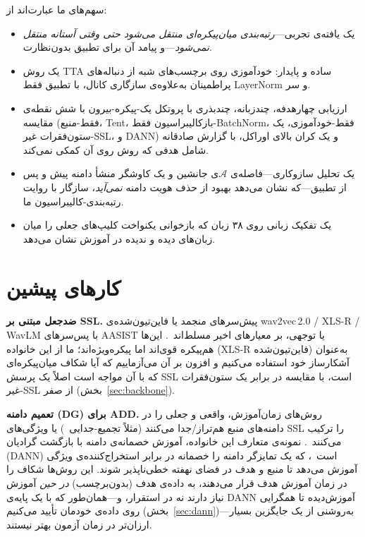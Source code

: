 \documentclass[a4paper,11pt]{article}
\begin{document}
سهم‌های ما عبارت‌اند از:
\begin{itemize}
\item یک یافته‌ی تجربی---\emph{رتبه‌بندی میان‌پیکره‌ای منتقل می‌شود حتی وقتی
آستانه منتقل نمی‌شود}---و پیامد آن برای تطبیق بدون‌نظارت.
\item یک روش TTA ساده و پایدار: خودآموزی روی برچسب‌های شبه از دنباله‌های
پراطمینان به‌علاوه‌ی سازگاری کانال، با تطبیق فقط LayerNorm و سر.
\item ارزیابی چهارهدفه، چندزبانه، چندبذری با پروتکل یک-پیکره-بیرون با شش
نقطه‌ی مقایسه (فقط-منبع، Tent، بازکالیبراسیون فقط-BatchNorm، فقط-خودآموزی،
یک ستون‌فقرات غیر-SSL، و DANN) و یک کران بالای اوراکل، با گزارش صادقانه
شامل هدفی که روش روی آن کمکی نمی‌کند.
\item یک تحلیل سازوکاری---فاصله‌ی $\mathcal{A}$ی جانشین و یک کاوشگر منشأ
دامنه پیش و پس از تطبیق---که نشان می‌دهد بهبود از حذف هویت دامنه
\emph{نمی‌آید}، سازگار با روایت رتبه‌بندی-کالیبراسیون ما.
\item یک تفکیک زبانی روی ۳۸ زبان که بازخوانی یکنواخت کلیپ‌های جعلی را میان
زبان‌های دیده و ندیده در آموزش نشان می‌دهد.
\end{itemize}

\section{کارهای پیشین}
\textbf{ضدجعل مبتنی بر SSL.} پیش‌سرهای منجمد یا فاین‌تیون‌شده‌ی
wav2vec\,2.0 / XLS-R / WavLM با پس‌سرهای AASIST یا توجهی، بر معیارهای اخیر
مسلط‌اند~\cite{wav2vec2aug,xlsrsls,aasist,rawnet2}. این‌ها هم‌پیکره قوی‌اند
اما پیکره‌ویژه‌اند؛ ما از این خانواده (XLS-R فاین‌تیون‌شده) به‌عنوان
آشکارساز خود استفاده می‌کنیم و افزون بر آن می‌آزماییم که آیا شکاف
میان‌پیکره‌ای که با آن مواجه است اصلاً یک پرسش SSL است، با مقایسه در برابر
یک ستون‌فقرات غیر-SSL از صفر (بخش~\ref{sec:backbone}).

\textbf{تعمیم دامنه (DG) برای ADD.} روش‌های زمان‌آموزش، واقعی و جعلی را در
دامنه‌های منبع هم‌تراز/جدا می‌کنند (مثلاً تجمیع-جدایی~\cite{asdg}) یا
ویژگی‌های SSL را ترکیب می‌کنند~\cite{crossdomain}. نمونه‌ی متعارف این
خانواده، آموزش خصمانه‌ی دامنه با بازگشت گرادیان (DANN) است~\cite{dann}، که
یک تمایزگر دامنه را خصمانه در برابر استخراج‌کننده‌ی ویژگی آموزش می‌دهد تا
منبع و هدف در فضای نهفته خطی‌ناپذیر شوند. این روش‌ها شکاف را در زمان آموزش
هدف قرار می‌دهند، به داده‌ی هدف (بدون‌برچسب) \emph{در حین} آموزش نیاز
دارند نه در استقرار، و---همان‌طور که با یک پایه‌ی DANN آموزش‌دیده تا
همگرایی روی داده‌ی خودمان تأیید می‌کنیم (بخش~\ref{sec:dann})---به‌روشنی از
یک جایگزین بسیار ارزان‌تر در زمان آزمون بهتر نیستند.
\end{document}

